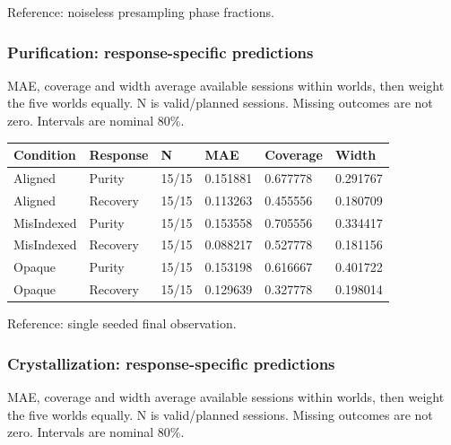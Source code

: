 \documentclass[10pt,a4paper]{article}
\begin{document}
Reference: noiseless presampling phase fractions.

\subsubsection{Purification: response-specific predictions}\label{purification-response-specific-predictions}

MAE, coverage and width average available sessions within worlds, then weight the five worlds equally. N is valid/planned sessions. Missing outcomes are not zero. Intervals are nominal 80\%.

{\def\LTcaptype{table} %
\small\begin{longtable}[]{@{}llllll@{}}
\toprule\noalign{}
Condition & Response & N & MAE & Coverage & Width \\
\midrule\noalign{}
\endhead
\bottomrule\noalign{}
\endlastfoot
Aligned & Purity & 15/15 & 0.151881 & 0.677778 & 0.291767 \\
Aligned & Recovery & 15/15 & 0.113263 & 0.455556 & 0.180709 \\
MisIndexed & Purity & 15/15 & 0.153558 & 0.705556 & 0.334417 \\
MisIndexed & Recovery & 15/15 & 0.088217 & 0.527778 & 0.181156 \\
Opaque & Purity & 15/15 & 0.153198 & 0.616667 & 0.401722 \\
Opaque & Recovery & 15/15 & 0.129639 & 0.327778 & 0.198014 \\
\end{longtable}\normalsize
}

Reference: single seeded final observation.

\subsubsection{Crystallization: response-specific predictions}\label{crystallization-response-specific-predictions}

MAE, coverage and width average available sessions within worlds, then weight the five worlds equally. N is valid/planned sessions. Missing outcomes are not zero. Intervals are nominal 80\%.
\end{document}
